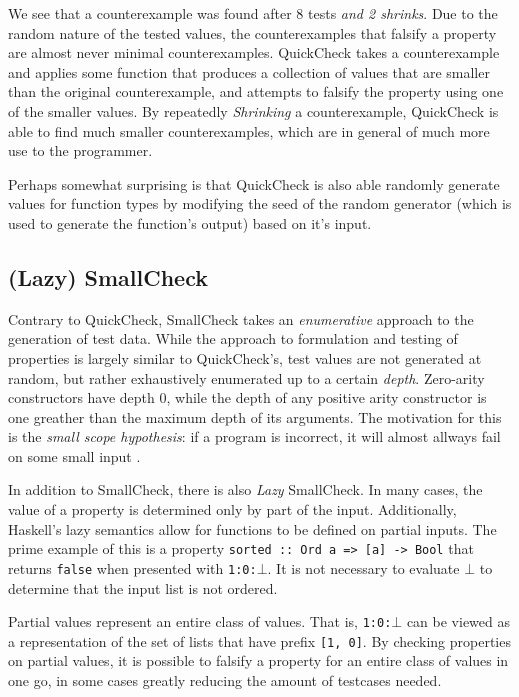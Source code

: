 \documentclass[a4paper,msc,twosized=semi]{uustthesis}
\begin{document}
  We see that a counterexample was found after 8 tests \textit{and 2 shrinks}. Due to 
  the random nature of the tested values, the counterexamples that falsify a property 
  are almost never minimal counterexamples. QuickCheck takes a counterexample and 
  applies some function that produces a collection of values that are smaller than the 
  original counterexample, and attempts to falsify the property using one of the 
  smaller values. By repeatedly \textit{Shrinking} a counterexample, QuickCheck is 
  able to find much smaller counterexamples, which are in general of much more use to 
  the programmer. 

  Perhaps somewhat surprising is that QuickCheck is also able randomly generate values 
  for function types by modifying the seed of the random generator (which is used to 
  generate the function's output) based on it's input. 

\subsection{(Lazy) SmallCheck} 

  Contrary to QuickCheck, SmallCheck \cite{runciman2008smallcheck} takes an \textit
  {enumerative} approach to the generation of test data. While the approach to 
  formulation and testing of properties is largely similar to QuickCheck's, test 
  values are not generated at random, but rather exhaustively enumerated up to a 
  certain \textit{depth}. Zero-arity constructors have depth $0$, while the depth of 
  any positive arity constructor is one greather than the maximum depth of its 
  arguments. The motivation for this is the \textit{small scope hypothesis}: if a 
  program is incorrect, it will almost allways fail on some small input \cite
  {andoni2003evaluating}. 

  In addition to SmallCheck, there is also \textit{Lazy} SmallCheck. In many cases, 
  the value of a property is determined only by part of the input. Additionally, 
  Haskell's lazy semantics allow for functions to be defined on partial inputs. The 
  prime example of this is a property \texttt{sorted :: Ord a => [a] -> Bool} that 
  returns \texttt{false} when presented with \texttt{1:0:$\bot$}. It is not necessary 
  to evaluate $\bot$ to determine that the input list is not ordered. 

  Partial values represent an entire class of values. That is, \texttt{1:0:$\bot$} can 
  be viewed as a representation of the set of lists that have prefix \texttt{[1, 0]}. 
  By checking properties on partial values, it is possible to falsify a property for 
  an entire class of values in one go, in some cases greatly reducing the amount of 
  testcases needed. 
\end{document}
